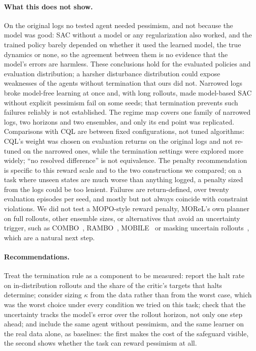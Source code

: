 \documentclass[11pt]{article}
\begin{document}
\paragraph{What this does not show.} On the original logs no tested agent needed pessimism, and not because the model was good: SAC without a model or any regularization also worked, and the trained policy barely depended on whether it used the learned model, the true dynamics or none, so the agreement between them is no evidence that the model's errors are harmless. These conclusions hold for the evaluated policies and evaluation distribution; a harsher disturbance distribution could expose weaknesses of the agents without termination that ours did not. Narrowed logs broke model-free learning at once and, with long rollouts, made model-based SAC without explicit pessimism fail on some seeds; that termination prevents such failures reliably is not established. The regime map covers one family of narrowed logs, two horizons and two ensembles, and only its end point was replicated. Comparisons with CQL are between fixed configurations, not tuned algorithms: CQL's weight was chosen on evaluation returns on the original logs and not re-tuned on the narrowed ones, while the termination settings were explored more widely; ``no resolved difference'' is not equivalence. The penalty recommendation is specific to this reward scale and to the two constructions we compared; on a task where unseen states are much worse than anything logged, a penalty sized from the logs could be too lenient. Failures are return-defined, over twenty evaluation episodes per seed, and mostly but not always coincide with constraint violations. We did not test a MOPO-style reward penalty, MOReL's own planner on full rollouts, other ensemble sizes, or alternatives that avoid an uncertainty trigger, such as COMBO~\citep{yu2021combo}, RAMBO~\citep{rigter2022rambo}, MOBILE~\citep{sun2023mobile} or masking uncertain rollouts~\citep{pan2020m2ac}, which are a natural next step.

\paragraph{Recommendations.} Treat the termination rule as a component to be measured: report the halt rate on in-distribution rollouts and the share of the critic's targets that halts determine; consider sizing $\kappa$ from the data rather than from the worst case, which was the worst choice under every condition we tried on this task; check that the uncertainty tracks the model's error over the rollout horizon, not only one step ahead; and include the same agent without pessimism, and the same learner on the real data alone, as baselines: the first makes the cost of the safeguard visible, the second shows whether the task can reward pessimism at all.
\end{document}
